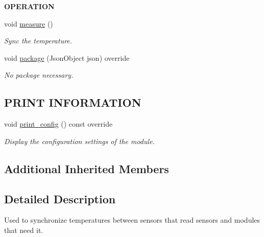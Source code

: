 \begin{Indent}{\bf O\+P\+E\+R\+A\+T\+I\+ON}\par
\begin{DoxyCompactItemize}
\item 
void \hyperlink{class_loom_temp_sync_a11847e2106c869af9644e32c34cd68ea}{measure} ()
\begin{DoxyCompactList}\small\item\em Sync the temperature. \end{DoxyCompactList}\item 
void \hyperlink{class_loom_temp_sync_aa36abfbdda84295decbfdc962f7344c8}{package} (Json\+Object json) override
\begin{DoxyCompactList}\small\item\em No package necessary. \end{DoxyCompactList}\end{DoxyCompactItemize}
\end{Indent}
\subsection*{P\+R\+I\+NT I\+N\+F\+O\+R\+M\+A\+T\+I\+ON}
\begin{DoxyCompactItemize}
\item 
void \hyperlink{class_loom_temp_sync_a7ebfed68ee73f407d698e70a023d5b5d}{print\+\_\+config} () const override
\begin{DoxyCompactList}\small\item\em Display the configuration settings of the module. \end{DoxyCompactList}\end{DoxyCompactItemize}
\subsection*{Additional Inherited Members}


\subsection{Detailed Description}
Used to synchronize temperatures between sensors that read sensors and modules that need it. 

